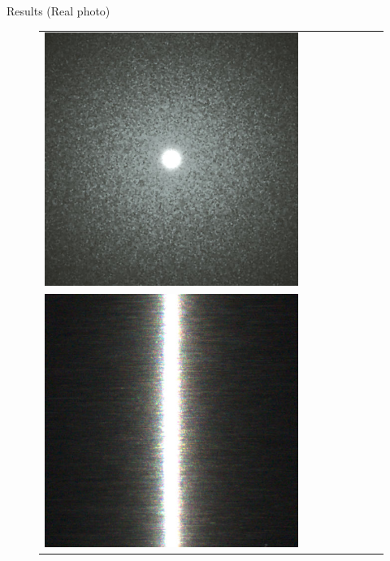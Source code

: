 \documentclass[final]{beamer}
\newlength{\twocolwid}
\newlength{\resultwidth}
\begin{document}
\begin{frame}[t]
\begin{columns}[t]
\begin{column}{\twocolwid}
\begin{block}{Results (Real photo)}
\begin{figure}[t]
\begin{tabular}{ccrclccc}
            		\includegraphics[width=\resultwidth]{images/real/flake/bad1.jpg}
            		\\
            		\includegraphics[width=\resultwidth]{images/real/metal/target.jpg} &

\end{tabular}
\end{figure}
\end{block}
\end{column}
\end{columns}
\end{frame}
\end{document}
